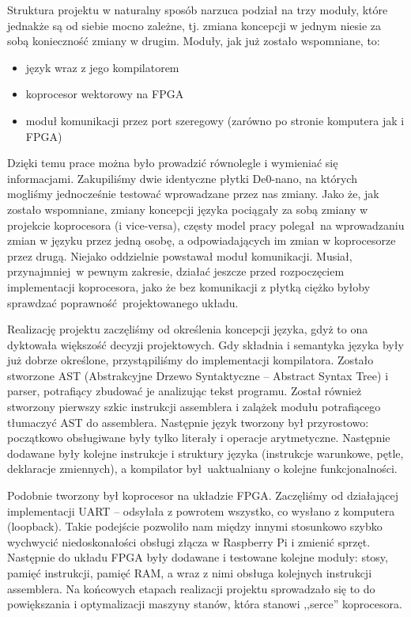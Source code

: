 Struktura projektu w naturalny sposób narzuca podział na trzy moduły, które jednakże są od siebie mocno zależne, tj. zmiana koncepcji w jednym niesie za sobą konieczność zmiany w drugim. Moduły, jak już zostało wspomniane, to:
\begin{itemize}
  \item język wraz z jego kompilatorem
  \item koprocesor wektorowy na FPGA
  \item moduł komunikacji przez port szeregowy (zarówno po stronie komputera jak i FPGA)
\end{itemize}

Dzięki temu prace można było prowadzić równolegle i wymieniać się informacjami. Zakupiliśmy dwie identyczne płytki De0-nano, na których mogliśmy jednocześnie testować wprowadzane przez nas zmiany. Jako że, jak zostało wspomniane, zmiany koncepcji języka pociągały za sobą zmiany w projekcie koprocesora (i vice-versa), częsty model pracy polegał na wprowadzaniu zmian w języku przez jedną osobę, a odpowiadających im zmian w koprocesorze przez drugą. Niejako oddzielnie powstawał moduł komunikacji. Musiał, przynajmniej w pewnym zakresie, działać jeszcze przed rozpoczęciem implementacji koprocesora, jako że bez komunikacji z płytką ciężko byłoby sprawdzać poprawność projektowanego układu.

Realizację projektu zaczęliśmy od określenia koncepcji języka, gdyż to ona dyktowała większość decyzji projektowych. Gdy składnia i semantyka języka były już dobrze określone, przystąpiliśmy do implementacji kompilatora. Zostało stworzone AST (Abstrakcyjne Drzewo Syntaktyczne -- Abstract Syntax Tree) i parser, potrafiący zbudować je analizując tekst programu. Został również stworzony pierwszy szkic instrukcji assemblera i zalążek modułu potrafiącego tłumaczyć AST do assemblera. Następnie język tworzony był przyrostowo: początkowo obsługiwane były tylko literały i operacje arytmetyczne. Następnie dodawane były kolejne instrukcje i struktury języka (instrukcje warunkowe, pętle, deklaracje zmiennych), a kompilator był uaktualniany o kolejne funkcjonalności.

Podobnie tworzony był koprocesor na układzie FPGA. Zaczęliśmy od działającej implementacji UART -- odsyłała z powrotem wszystko, co wysłano z komputera (loopback). Takie podejście pozwoliło nam między innymi stosunkowo szybko wychwycić niedoskonałości obsługi złącza w Raspberry Pi i zmienić sprzęt. Następnie do układu FPGA były dodawane i testowane kolejne moduły: stosy, pamięć instrukcji, pamięć RAM, a wraz z nimi obsługa kolejnych instrukcji assemblera. Na końcowych etapach realizacji projektu sprowadzało się to do powiększania i optymalizacji maszyny stanów, która stanowi ,,serce'' koprocesora.

